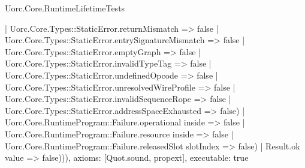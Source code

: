 \begin{lexlean}{Uorc.Core.RuntimeLifetimeTests}
\begin{semanticmodule}
{          | Uorc.Core.Types::StaticError.returnMismatch => false
          | Uorc.Core.Types::StaticError.entrySignatureMismatch => false
          | Uorc.Core.Types::StaticError.emptyGraph => false
          | Uorc.Core.Types::StaticError.invalidTypeTag => false
          | Uorc.Core.Types::StaticError.undefinedOpcode => false
          | Uorc.Core.Types::StaticError.unresolvedWireProfile => false
          | Uorc.Core.Types::StaticError.invalidSequenceRope => false
          | Uorc.Core.Types::StaticError.addressSpaceExhausted => false)
        | Uorc.Core.RuntimeProgram::Failure.operational inside => false
        | Uorc.Core.RuntimeProgram::Failure.resource inside => false
        | Uorc.Core.RuntimeProgram::Failure.releasedSlot slotIndex => false)
      | Result.ok value => false))),
  axioms: [Quot.sound, propext],
  executable: true
}


\end{semanticmodule}
\end{lexlean}
